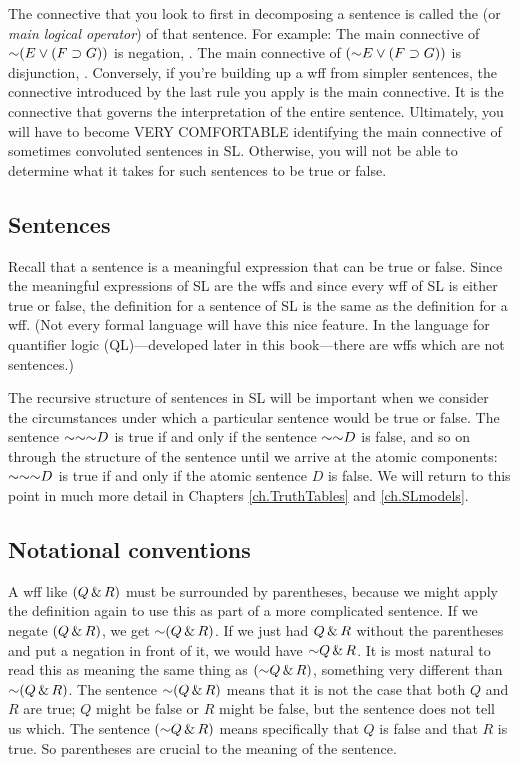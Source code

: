The connective that you look to first in decomposing a sentence is called the  (or \emph{main logical operator}) of that sentence. For example: The main connective of $\enot (E \eor (F \eif G))$ is negation, \enot. The main connective of $(\enot E \eor (F \eif G))$ is disjunction, \eor. Conversely, if you're building up a wff from simpler sentences, the connective introduced by the last rule you apply is the main connective. It is the connective that governs the interpretation of the entire sentence. {\color{black} Ultimately, you will have to become VERY COMFORTABLE identifying the main connective of sometimes convoluted sentences in SL. Otherwise, you will not be able to determine what it takes for such sentences to be true or false.}


\subsection{Sentences}
Recall that a sentence is a meaningful expression that can be true or false. Since the meaningful expressions of SL are the wffs and since every wff of SL is either true or false, the definition for a sentence of SL is the same as the definition for a wff. (Not every formal language will have this nice feature. In the language for quantifier logic (QL)---developed later in this book---there are wffs which are not sentences.)

The recursive structure of sentences in SL will be important when we consider the circumstances under which a particular sentence would be true or false. The sentence $\enot \enot \enot D$ is true if and only if the sentence $\enot \enot D$ is false, and so on through the structure of the sentence until we arrive at the atomic components: $\enot \enot \enot D$ is true if and only if the atomic sentence $D$ is false. We will return to this point in much more detail in Chapters \ref{ch.TruthTables} and \ref{ch.SLmodels}.



\subsection{Notational conventions}
\label{SLconventions}
A wff like $(Q \,\&\, R)$ must be surrounded by parentheses, because we might apply the definition again to use this as part of a more complicated sentence. If we negate $(Q \,\&\, R)$, we get $\enot(Q \eand R)$. If we just had $Q \,\&\, R$ without the parentheses and put a negation in front of it, we would have $\enot Q \eand R$. It is most natural to read this as meaning the same thing as $(\enot Q \eand R)$, something very different than $\enot(Q\eand R)$. The sentence $\enot(Q \eand R)$ means that it is not the case that both $Q$ and $R$ are true; $Q$ might be false or $R$ might be false, but the sentence does not tell us which. The sentence $(\enot Q \eand R)$ means specifically that $Q$ is false and that $R$ is true. So parentheses are crucial to the meaning of the sentence.

